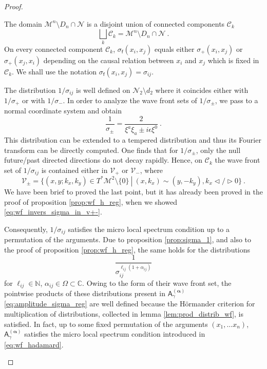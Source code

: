 \documentclass[11pt]{book}
\newcommand{\alphabd}{\boldsymbol{\alpha}}
\newcommand{\Ccal}{\mathcal{C}}
\newcommand{\Mcal}{\mathcal{M}}
\newcommand{\Ncal}{\mathcal{N}}
\newcommand{\Vcal}{\mathcal{V}}
\newcommand{\Cbb}{\mathbb{C}}
\newcommand{\Nbb}{\mathbb{N}}
\newcommand{\Asf}{\mathsf{A}}
\newcommand{\fsf}{\mathsf{f}}
\theoremstyle{break}
\begin{document}
\begin{proof}
\begin{description}
\item The domain $\Mcal^n\setminus D_n\cap \Ncal$ is a disjoint union of connected components $\Ccal_k$
%
\begin{equation*}
\bigsqcup_k \Ccal_k = \Mcal^n\setminus D_n\cap \Ncal \ .
\end{equation*}
%
On every connected component $\Ccal_k$, $\sigma_\fsf(x_i,x_j)$ equals either $\sigma_+(x_i,x_j)$ or $\sigma_+(x_j,x_i)$ depending on the causal relation between $x_i$ and $x_j$ which is fixed in $\Ccal_k$. We shall use the notation $\sigma_\fsf(x_i,x_j)=\sigma_{ij}$.

%
%
\item[\ref{item:1_amplitude_sigma_prop_analyt}] The distribution $1/\sigma_{ij}$ is well defined on $\Ncal_2\setminus d_2$ where it coincides either with $1/\sigma_+$ or with $1/\sigma_-$. In order to analyze the wave front sets of $1/\sigma_\pm$, we pass to a normal coordinate system and obtain 
%
\begin{equation*}
\frac{1}{\sigma_\pm} = \frac{2}{\xi^a\xi_a\pm i\epsilon \xi^0} \ . 
\end{equation*}
%
This distribution can be extended to a tempered  distribution and thus its Fourier transform can be directly computed. One finds that for $1/\sigma_\pm$, only the null future/past directed directions do not decay rapidly. Hence, on $\Ccal_k$ the wave front set of $1/\sigma_{ij}$ is contained either in $\Vcal_+$ or $\Vcal_-$, where
%
\begin{equation*}
\Vcal_\pm = \bigg\{(x,y;k_x,k_y) \in T^\ast\Mcal^2\setminus\{0\} \ \left| \ (x,k_x) \sim (y,-k_y),  k_x \triangleleft / \triangleright 0 \bigg\} \right. \ .
\end{equation*}
%
We have been brief to proved the last point, but it has already been proved in the proof of proposition \ref{prop:wf_h_reg}, when we showed \eqref{eq:wf_invers_sigma_in_v+-}.\par%
%
Consequently, $1/\sigma_{ij}$ satisfies the micro local spectrum condition up to a permutation of the arguments. Due to proposition \ref{prop:sigma_1}, and also to the proof of proposition \ref{prop:wf_h_reg}, the same holds for the distributions
%
\begin{equation*}
\frac{1}{\sigma_{ij}^{\ell_{ij}(1+\alpha_{ij})}}
\end{equation*}
%
for $\ell_{ij} \in \Nbb$, $\alpha_{ij}\in\Omega\subset\Cbb$. Owing to the form of their wave front set, the pointwise products of these distributions present in $\Asf_\gamma^{(\alphabd)}$ \eqref{eq:amplitude_sigma_reg} are well defined because the Hörmander criterion for multiplication of distributions, collected in lemma \ref{lem:prod_distrib_wf}, is satisfied. In fact, up to some fixed permutation of the arguments $(x_1,\dots x_n)$, $\Asf_\gamma^{(\alphabd)}$ satisfies the micro local spectrum condition introduced in \ref{eq:wf_hadamard}. \par%

\end{description}
\end{proof}
\end{document}
